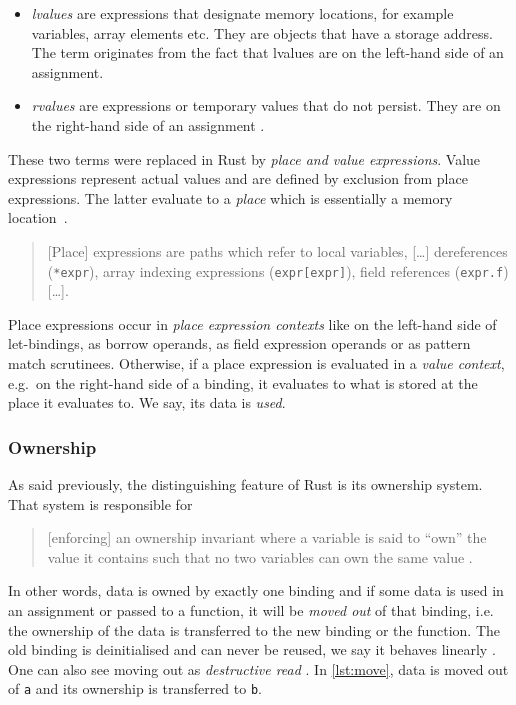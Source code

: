 \begin{itemize}
\tightlist
\item
  \emph{lvalues} are expressions that designate memory locations, for
  example variables, array elements etc. They are objects that have a
  storage address. The term originates from the fact that lvalues are on
  the left-hand side of an assignment.
\item
  \emph{rvalues} are expressions or temporary values that do not
  persist. They are on the right-hand side of an assignment \cite{wiki:lvalues}.
\end{itemize}

These two terms were replaced in Rust by \emph{place and value expressions}.
Value expressions represent actual values and are defined by exclusion from
place expressions. The latter evaluate to a \emph{place} which is essentially a
memory location~\cite{rustref}.

\begin{quote}
{[}Place{]} expressions are paths which refer to local variables,
{[}\ldots{]} dereferences (\passthrough{\lstinline!*expr!}), array
indexing expressions (\passthrough{\lstinline!expr[expr]!}), field
references (\passthrough{\lstinline!expr.f!}) {[}\ldots{]}. \\
\cite[section ``Expressions'']{rustref}
\end{quote}

Place expressions occur in \emph{place expression contexts} like on the
left-hand side of let-bindings, as borrow operands, as field expression
operands or as pattern match scrutinees. Otherwise, if a place
expression is evaluated in a \emph{value context}, e.g.~on the
right-hand side of a binding, it evaluates to what is stored at the
place it evaluates to. We say, its data is \emph{used}.

\subsubsection{Ownership}

As said previously, the distinguishing feature of Rust is its ownership system.
That system is responsible for

\begin{quote}
{[enforcing]} an ownership invariant where a
variable is said to ``own'' the value it contains such that no two variables can
own the same value \cite[page 5]{lightweight-formalism}.
\end{quote}

In other words, data is owned by exactly one binding and if some data is used in
an assignment or passed to a function, it will be \emph{moved out} of that
binding, i.e. the ownership of the data is transferred to the new binding or the
function. The old binding is deinitialised and can never be reused, we say it
behaves linearly \cite{oxide}. One can also see moving out as \emph{destructive
read} \cite{islands-alias-protection}. In \autoref{lst:move}, data is moved out
of \passthrough{\lstinline!a!} and its ownership is transferred to
\passthrough{\lstinline!b!}.

